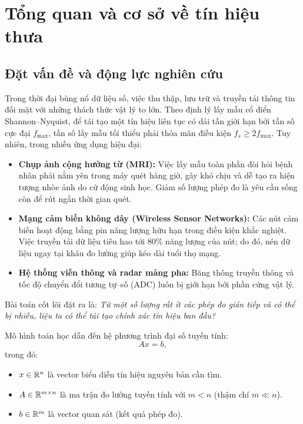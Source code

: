 \chapter{Tổng quan và cơ sở về tín hiệu thưa}
\label{chap:tong_quan}

\section{Đặt vấn đề và động lực nghiên cứu}
Trong thời đại bùng nổ dữ liệu số, việc thu thập, lưu trữ và truyền tải thông tin đối mặt với những thách thức vật lý to lớn. Theo định lý lấy mẫu cổ điển Shannon--Nyquist, để tái tạo một tín hiệu liên tục có dải tần giới hạn bởi tần số cực đại $f_{\max}$, tần số lấy mẫu tối thiểu phải thỏa mãn điều kiện $f_s \ge 2 f_{\max}$. Tuy nhiên, trong nhiều ứng dụng hiện đại:
\begin{itemize}
    \item \textbf{Chụp ảnh cộng hưởng từ (MRI):} Việc lấy mẫu toàn phần đòi hỏi bệnh nhân phải nằm yên trong máy quét hàng giờ, gây khó chịu và dễ tạo ra hiện tượng nhòe ảnh do cử động sinh học. Giảm số lượng phép đo là yêu cầu sống còn để rút ngắn thời gian quét.
    \item \textbf{Mạng cảm biến không dây (Wireless Sensor Networks):} Các nút cảm biến hoạt động bằng pin năng lượng hữu hạn trong điều kiện khắc nghiệt. Việc truyền tải dữ liệu tiêu hao tới 80\% năng lượng của nút; do đó, nén dữ liệu ngay tại khâu đo lường giúp kéo dài tuổi thọ mạng.
    \item \textbf{Hệ thống viễn thông và radar mảng pha:} Băng thông truyền thông và tốc độ chuyển đổi tương tự--số (ADC) luôn bị giới hạn bởi phần cứng vật lý.
\end{itemize}

Bài toán cốt lõi đặt ra là: \emph{Từ một số lượng rất ít các phép đo gián tiếp và có thể bị nhiễu, liệu ta có thể tái tạo chính xác tín hiệu ban đầu?}

Mô hình toán học dẫn đến hệ phương trình đại số tuyến tính:
\begin{equation}
    Ax = b,
    \label{eq:underdetermined_system}
\end{equation}
trong đó:
\begin{itemize}
    \item $x \in \mathbb{R}^n$ là vector biểu diễn tín hiệu nguyên bản cần tìm.
    \item $A \in \mathbb{R}^{m \times n}$ là ma trận đo lường tuyến tính với $m < n$ (thậm chí $m \ll n$).
    \item $b \in \mathbb{R}^m$ là vector quan sát (kết quả phép đo).
\end{itemize}

